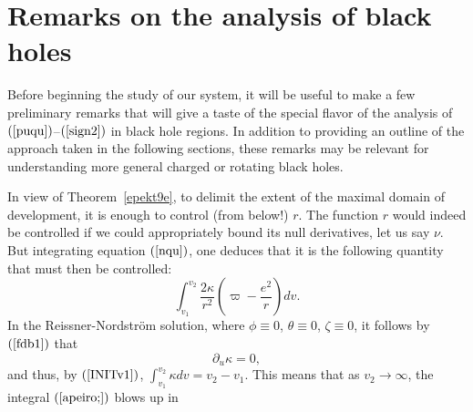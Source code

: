 \documentclass{article}
\begin{document}
\section{Remarks on the analysis of black holes}
\label{ovvsec}
Before beginning the study of our system, 
it will be useful to make a few preliminary remarks that will give
a taste of the special flavor of the analysis of 
$(\ref{puqu})$--$(\ref{sign2})$
in black hole regions. 
In addition to providing an outline
of the approach taken in the following sections, these remarks
may be relevant for understanding more
general charged or rotating black holes.

In view of Theorem~\ref{epekt9e}, to delimit the extent of the maximal
domain of development, it is enough to control (from below!) $r$. 
The function $r$ would indeed be controlled if
we could appropriately bound
its null derivatives, let us say $\nu$.
But integrating equation $(\ref{nqu})$, one deduces that it
is the following quantity that must then be controlled:
\begin{equation}
\label{apeiro;}
\int_{v_1}^{v_2}{\frac{2\kappa}{r^2}
\left(\varpi-\frac{e^2}r\right)dv}.
\end{equation}
In the Reissner-Nordstr\"om solution, where $\phi\equiv0$, $\theta\equiv0$,
$\zeta\equiv0$, it follows by $(\ref{fdb1})$ that 
\[
\partial_u\kappa=0,
\]
and thus, by $(\ref{INITv1})$, 
$\int_{v_1}^{v_2}\kappa dv=v_2-v_1$.
This means that as $v_2\to\infty$, the integral $(\ref{apeiro;})$
blows up in
\end{document}
